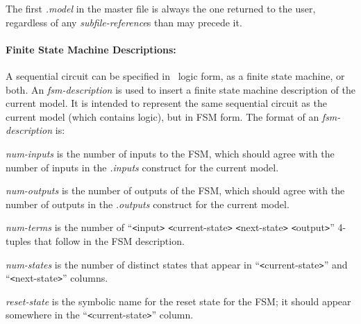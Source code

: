 {\begin{pespace}
The first {\em .model} in the master file is always the one returned to the
user, regardless of any {\em subfile-reference}s than may precede it.

\paragraph{Finite State Machine Descriptions:}

A sequential circuit can be specified in \BLIF\ logic form, as a finite
state machine, or both.  An {\em fsm-description} is used to insert a finite
state machine description of the current model.  It is intended to represent
the same sequential circuit as the current model (which contains logic), but
in FSM form.  The format of an {\em fsm-description} is:

\begin{description}
\item {\em num-inputs} is the number of inputs to the FSM, which should
agree with the number of inputs in the {\em .inputs} construct for the
current model.

\item {\em num-outputs} is the number of outputs of the FSM, which should
agree with the number of outputs in the {\em .outputs} construct for the
current model.

\item {\em num-terms} is the number of ``{\verb|<|}input{\verb|>|}
{\verb|<|}current-state{\verb|>|} {\verb|<|}next-state{\verb|>|}
{\verb|<|}output{\verb|>|}'' 4-tuples that follow in the FSM description.

\item {\em num-states} is the number of distinct states that appear in
``{\verb|<|}current-state{\verb|>|}'' and ``{\verb|<|}next-state{\verb|>|}''
columns.

\item {\em reset-state} is the symbolic name for the reset state for the
FSM; it should appear somewhere in the ``{\verb|<|}current-state{\verb|>|}''
column.


\end{description}
\end{pespace}}
